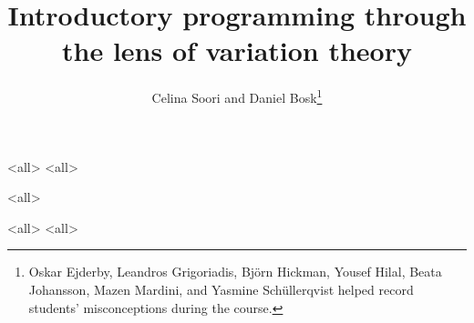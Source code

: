 \documentclass[ignoreframetext]{beamer}
\begin{document}

\title{%
  Introductory programming through the lens of variation theory%
}
\author{%
  Celina Soori and
  Daniel Bosk\thanks{%
    Oskar Ejderby,
    Leandros Grigoriadis,
    Björn Hickman,
    Yousef Hilal,
    Beata Johansson,
    Mazen Mardini, and
    Yasmine Schüllerqvist
    helped record students' misconceptions during the course.
  }%
}

\mode*

\begin{frame}
  \maketitle
\end{frame}

\begin{abstract}
  
\end{abstract}

\begin{frame}
  \tableofcontents[subsectionstyle=hide,subsubsectionstyle=hide]
\end{frame}

\mode<all>{}
\mode<all>{}



\mode<all>{}

\mode<all>{}
\mode<all>{}








\begin{frame}[allowframebreaks]
\printbibliography
\end{frame}

\appendix
\end{document}

